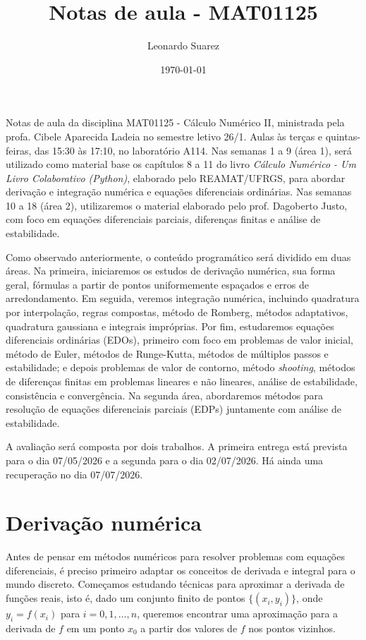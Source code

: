 \documentclass{article}
\title{Notas de aula - MAT01125}
\author{Leonardo Suarez}
\date{\today}
\begin{document}
\maketitle

Notas de aula da disciplina MAT01125 - Cálculo Numérico II, ministrada pela profa. Cibele Aparecida Ladeia no semestre letivo 26/1. Aulas às terças e quintas-feiras, das 15:30 às 17:10, no laboratório A114. Nas semanas 1 a 9 (área 1), será utilizado como material base os capítulos 8 a 11 do livro \emph{Cálculo Numérico - Um Livro Colaborativo (Python)}, elaborado pelo REAMAT/UFRGS, para abordar derivação e integração numérica e equações diferenciais ordinárias. Nas semanas 10 a 18 (área 2), utilizaremos o material elaborado pelo prof. Dagoberto Justo, com foco em equações diferenciais parciais, diferenças finitas e análise de estabilidade.

Como observado anteriormente, o conteúdo programático será dividido em duas áreas. Na primeira, iniciaremos os estudos de derivação numérica, sua forma geral, fórmulas a partir de pontos uniformemente espaçados e erros de arredondamento. Em seguida, veremos integração numérica, incluindo quadratura por interpolação, regras compostas, método de Romberg, métodos adaptativos, quadratura gaussiana e integrais impróprias. Por fim, estudaremos equações diferenciais ordinárias (EDOs), primeiro com foco em problemas de valor inicial, método de Euler, métodos de Runge-Kutta, métodos de múltiplos passos e estabilidade; e depois problemas de valor de contorno, método \emph{shooting}, métodos de diferenças finitas em problemas lineares e não lineares, análise de estabilidade, consistência e convergência. Na segunda área, abordaremos métodos para resolução de equações diferenciais parciais (EDPs) juntamente com análise de estabilidade.

A avaliação será composta por dois trabalhos. A primeira entrega está prevista para o dia 07/05/2026 e a segunda para o dia 02/07/2026. Há ainda uma recuperação no dia 07/07/2026.

\tableofcontents

\section{Derivação numérica}

Antes de pensar em métodos numéricos para resolver problemas com equações diferenciais, é preciso primeiro adaptar os conceitos de derivada e integral para o mundo discreto. Começamos estudando técnicas para aproximar a derivada de funções reais, isto é, dado um conjunto finito de pontos \(\{(x_i,y_i)\}\), onde \(y_i = f(x_i)\) para \(i = 0, 1, \ldots, n\), queremos encontrar uma aproximação para a derivada de \(f\) em um ponto \(x_0\) a partir dos valores de \(f\) nos pontos vizinhos.
\end{document}
